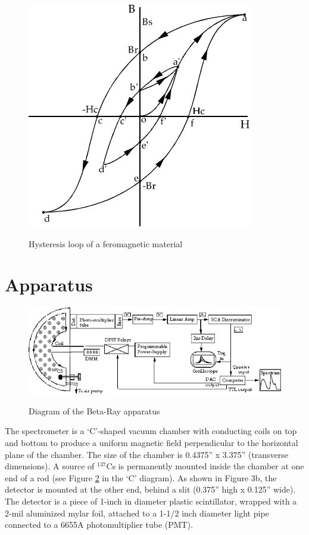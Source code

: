 \documentclass{../lab}
\begin{document}
\begin{figure}[h]
    \centering
    \href{http://experimentationlab.berkeley.edu/sites/default/files/images/BRAimage026.gif}{\includegraphics[width=0.5\linewidth]{images/BRAimage026.png}}
    \caption{Hysteresis loop of a feromagnetic material}
    \label{fig:BRAimage026}
\end{figure}

\section{Apparatus}

\begin{figure}[h]
    \centering
    \href{http://experimentationlab.berkeley.edu/sites/default/files/images/600px-BRAimage010.gif}{\includegraphics[width=0.5\linewidth]{images/600px-BRAimage010.png}}
    \caption{Diagram of the Beta-Ray apparatus}
    \label{fig:DiagramOfBetaRayApparatus}
\end{figure}

The spectrometer is a `C'-shaped vacuum chamber with conducting coils on top and bottom to produce a uniform magnetic field perpendicular to the horizontal plane of the chamber. The size of the chamber is 0.4375'' x 3.375'' (transverse dimensions). A source of $^{137}$Cs is permanently mounted inside the chamber at one end of a rod (see Figure \ref{fig:DiagramOfBetaRayApparatus} in the `C' diagram). As shown in Figure 3b, the detector is mounted at the other end, behind a slit (0.375'' high x 0.125'' wide). The detector is a piece of 1-inch in diameter plastic scintillator, wrapped with a 2-mil aluminized mylar foil, attached to a 1-1/2 inch diameter light pipe connected to a 6655A photomultiplier tube (PMT).
\end{document}
